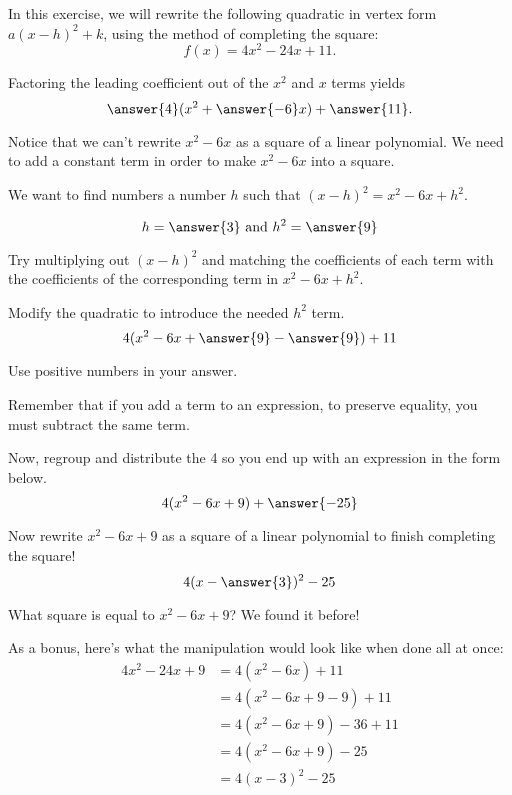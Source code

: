 \documentclass{ximera}
\author{Kenneth Berglund}
\begin{document}
In this exercise, we will rewrite the following quadratic in vertex form $a(x - h)^2 + k$, using the method of completing the square:
\[
f(x)=4x^2-24x+11.
\]
\begin{exercise}

Factoring the leading coefficient out of the $x^2$ and $x$ terms yields
$$
\answer{4}(x^2 + \answer{-6}x) + \answer{11}.
$$

\begin{exercise}
Notice that we can't rewrite $x^2 - 6x$ as a square of a linear polynomial. We need to add a constant term in order to make $x^2 - 6x$ into a square. 

We want to find numbers a number $h$ such that $(x - h)^2 = x^2 - 6x + h^2$.  

$$
h = \answer{3} \text{ and } h^2 = \answer{9}
$$
\begin{hint}
Try multiplying out $(x - h)^2$ and matching the coefficients of each term with the coefficients of the corresponding term in $x^2 - 6x + h^2$. 
\end{hint}


\begin{exercise}
Modify the quadratic to introduce the needed $h^2$ term.
$$
4(x^2 - 6x + \answer{9} - \answer{9}) + 11
$$ 

Use positive numbers in your answer.

\begin{hint}
Remember that if you add a term to an expression, to preserve equality, you must subtract the same term.
\end{hint}

\begin{exercise}
Now, regroup and distribute the 4 so you end up with an expression in the form below.
$$
4(x^2-6x+9) + \answer{-25}
$$ 

\begin{exercise}
Now rewrite $x^2 - 6x + 9$ as a square of a linear polynomial to finish completing the square!
$$
4(x - \answer{3})^2 -25
$$ 
\begin{hint}
What square is equal to $x^2 - 6x + 9$? We found it before!
\end{hint}

\begin{exercise}
As a bonus, here's what the manipulation would look like when done all at once:
\begin{align*}
4x^2 - 24x + 9 & = 4(x^2 - 6x) + 11 \\
& = 4(x^2 - 6x + 9 - 9) + 11 \\
& = 4(x^2-6x+9)-36 + 11\\
& = 4(x^2-6x+9)-25\\
& = 4(x - 3)^2 - 25
\end{align*}
\end{exercise}
\end{exercise}
\end{exercise}
\end{exercise}
\end{exercise}
\end{exercise}
\end{document}
